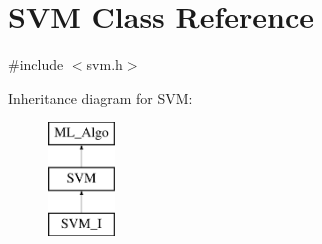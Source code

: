 \hypertarget{classSVM}{}\section{S\+VM Class Reference}
\label{classSVM}


{\ttfamily \#include $<$svm.\+h$>$}

Inheritance diagram for S\+VM\+:\begin{figure}[H]
\begin{center}
\leavevmode
\includegraphics[height=3.000000cm]{classSVM}
\end{center}
\end{figure}
